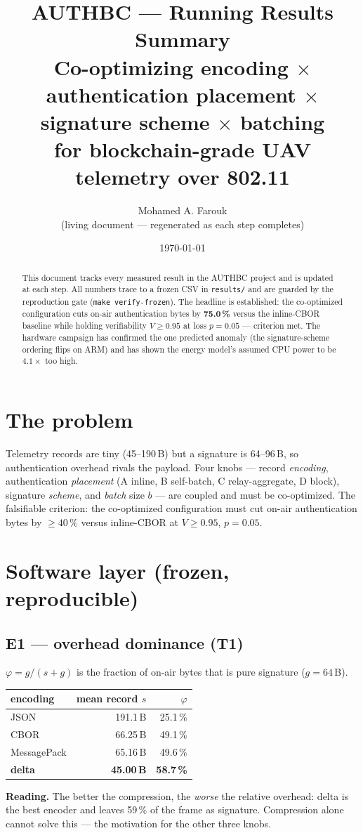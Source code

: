 \documentclass[11pt,a4paper]{article}
\title{\textbf{AUTHBC — Running Results Summary}\\[2mm]
\large Co-optimizing encoding $\times$ authentication placement $\times$ signature scheme $\times$
batching\\ for blockchain-grade UAV telemetry over 802.11}
\author{Mohamed A. Farouk \\ \small (living document --- regenerated as each step completes)}
\date{\today}
\begin{document}
\maketitle
\thispagestyle{fancy}

\begin{abstract}
\noindent This document tracks every measured result in the AUTHBC project and is updated at each
step. All numbers trace to a frozen CSV in \texttt{results/} and are guarded by the reproduction gate
(\texttt{make verify-frozen}). The headline is established: the co-optimized configuration cuts
on-air authentication bytes by \textbf{75.0\,\%} versus the inline-CBOR baseline while holding
verifiability $V\ge0.95$ at loss $p=0.05$ --- criterion met. The hardware campaign has confirmed the
one predicted anomaly (the signature-scheme ordering flips on ARM) and has shown the energy model's
assumed CPU power to be $4.1\times$ too high.
\end{abstract}

\section{The problem}
Telemetry records are tiny (45--190\,B) but a signature is 64--96\,B, so authentication overhead
rivals the payload. Four knobs --- record \emph{encoding}, authentication \emph{placement} (A inline,
B self-batch, C relay-aggregate, D block), signature \emph{scheme}, and \emph{batch} size $b$ --- are
coupled and must be co-optimized. The falsifiable criterion: the co-optimized configuration must cut
on-air authentication bytes by $\ge 40\,\%$ versus inline-CBOR at $V\ge0.95$, $p=0.05$.

\section{Software layer (frozen, reproducible)}

\subsection{E1 --- overhead dominance (T1)}
$\varphi = g/(s+g)$ is the fraction of on-air bytes that is pure signature ($g=64$\,B).
\begin{center}\begin{tabular}{lrr}
\toprule encoding & mean record $s$ & $\varphi$ \\ \midrule
JSON & 191.1\,B & 25.1\,\% \\ CBOR & 66.25\,B & 49.1\,\% \\ MessagePack & 65.16\,B & 49.6\,\% \\
\textbf{delta} & \textbf{45.00\,B} & \textbf{58.7\,\%} \\ \bottomrule
\end{tabular}\end{center}
\textbf{Reading.} The better the compression, the \emph{worse} the relative overhead: delta is the
best encoder and leaves 59\,\% of the frame as signature. Compression alone cannot solve this --- the
motivation for the other three knobs.
\end{document}

